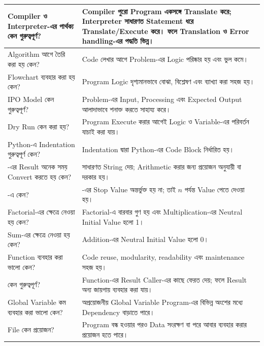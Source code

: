 \begin{longtable}{
|L{0.38\textwidth}
|L{0.54\textwidth}|
}

\endfirsthead

\endhead

Compiler ও Interpreter-এর পার্থক্য কেন গুরুত্বপূর্ণ?
&
Compiler পুরো Program একসঙ্গে Translate করে; Interpreter সাধারণত Statement ধরে Translate/Execute করে। ফলে Translation ও Error handling-এর পদ্ধতি ভিন্ন।
\\
\hline

Algorithm আগে তৈরি করা হয় কেন?
&
Code লেখার আগে Problem-এর Logic পরিষ্কার হয় এবং ভুল কমে।
\\
\hline

Flowchart ব্যবহার করা হয় কেন?
&
Program Logic দৃশ্যমানভাবে বোঝা, বিশ্লেষণ এবং ব্যাখ্যা করা সহজ হয়।
\\
\hline

IPO Model কেন গুরুত্বপূর্ণ?
&
Problem-এর Input, Processing এবং Expected Output আলাদাভাবে শনাক্ত করতে সাহায্য করে।
\\
\hline

Dry Run কেন করা হয়?
&
Program Execute করার আগেই Logic ও Variable-এর পরিবর্তন যাচাই করা যায়।
\\
\hline

Python-এ Indentation গুরুত্বপূর্ণ কেন?
&
Indentation দ্বারা Python-এর Code Block নির্ধারিত হয়।
\\
\hline

-এর Result অনেক সময় Convert করতে হয় কেন?
&
 সাধারণত String দেয়; Arithmetic করার জন্য প্রয়োজন অনুযায়ী  বা  দরকার হয়।
\\
\hline

-এ  কেন?
&
-এর Stop Value অন্তর্ভুক্ত হয় না; তাই \(n\) পর্যন্ত Value পেতে  দেওয়া হয়।
\\
\hline

Factorial-এর ক্ষেত্রে  নেওয়া হয় কেন?
&
Factorial-এ বারবার গুণ হয় এবং Multiplication-এর Neutral Initial Value হলো 1।
\\
\hline

Sum-এর ক্ষেত্রে  নেওয়া হয় কেন?
&
Addition-এর Neutral Initial Value হলো 0।
\\
\hline

Function ব্যবহার করা ভালো কেন?
&
Code reuse, modularity, readability এবং maintenance সহজ হয়।
\\
\hline

 কেন গুরুত্বপূর্ণ?
&
Function-এর Result Caller-এর কাছে ফেরত দেয়; ফলে Result অন্য জায়গায় ব্যবহার করা যায়।
\\
\hline

Global Variable কম ব্যবহার করা ভালো কেন?
&
অপ্রয়োজনীয় Global Variable Program-এর বিভিন্ন অংশের মধ্যে Dependency বাড়াতে পারে।
\\
\hline

File কেন প্রয়োজন?
&
Program বন্ধ হওয়ার পরও Data সংরক্ষণ বা পরে আবার ব্যবহার করার প্রয়োজন হতে পারে।
\\
\hline

\end{longtable}

